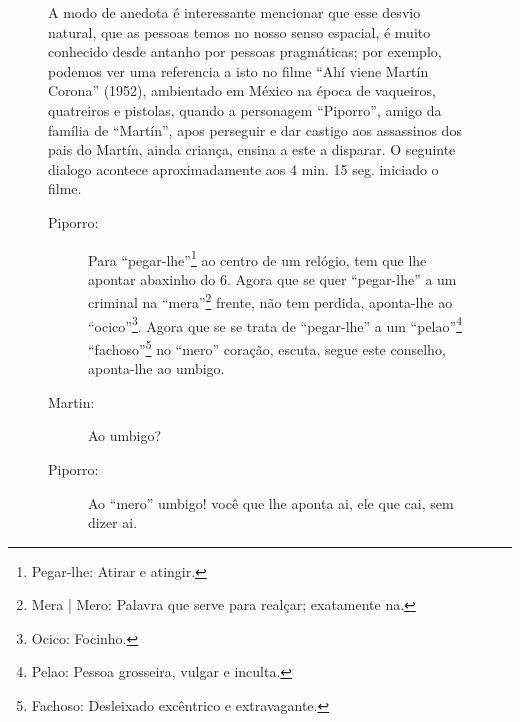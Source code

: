 \begin{figure}[!ht]
\begin{elaboracion}[title=Ah\'i viene Mart\'in Corona (1952), width= 1.00\linewidth]

A modo de anedota é interessante mencionar que esse desvio natural,
que as pessoas temos no nosso senso espacial, 
é muito conhecido desde antanho por pessoas pragmáticas;
por exemplo, podemos ver uma referencia a isto no filme ``Ahí viene Martín Corona'' (1952),
ambientado em México na época de vaqueiros, quatreiros e pistolas,
quando a personagem ``Piporro'', amigo da família de ``Martín'', 
apos perseguir e dar castigo aos assassinos dos pais do Martín, ainda criança, 
ensina a este a disparar.
O seguinte dialogo acontece aproximadamente aos 4 min. 15 seg. iniciado o filme.
\begin{description}
\item[Piporro:] 
Para ``pegar-lhe''\footnote{\label{foot:pegarle}Pegar-lhe: Atirar e atingir.} ao centro de um relógio, 
tem que lhe apontar abaxinho do 6. %
Agora que se quer ``pegar-lhe'' a um criminal na 
``mera''\footnote{\label{foot:mera}Mera | Mero: Palavra que serve para realçar; exatamente na.} frente, não tem perdida,
aponta-lhe ao ``ocico''\footnote{\label{foot:ocico}Ocico: Focinho.}.
Agora que se se trata de ``pegar-lhe'' a 
um ``pelao''\footnote{\label{foot:pelao}Pelao: Pessoa grosseira, vulgar e inculta.} 
``fachoso''\footnote{\label{foot:fachoso}Fachoso: Desleixado excêntrico e extravagante.} no ``mero'' coração,
escuta, segue este conselho, aponta-lhe ao umbigo.

\item[Martin:] Ao umbigo?

\item[Piporro:] Ao ``mero'' umbigo! você que lhe aponta ai, ele que cai, sem dizer ai.
\end{description}
\end{elaboracion}
\end{figure}
